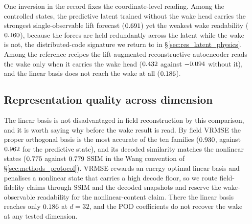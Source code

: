 One inversion in the record fixes the coordinate-level reading. Among the controlled states, the predictive latent trained without the wake head carries the strongest single-observable lift forecast ($0.691$) yet the weakest wake readability ($0.160$), because the forces are held redundantly across the latent while the wake is not, the distributed-code signature we return to in \S\ref{sec:res_latent_physics}. Among the reference recipes the lift-augmented reconstructive autoencoder reads the wake only when it carries the wake head ($0.432$ against $-0.094$ without it), and the linear basis does not reach the wake at all ($0.186$).\re




\subsection{Representation quality across dimension}
\label{sec:res_compress}





The linear basis is not disadvantaged in field reconstruction by this comparison, and it is worth saying why before the wake result is read. By field VRMSE the proper orthogonal basis is the most accurate of the ten families ($0.930$, against $0.962$ for the predictive state), and its decoded similarity matches the nonlinear states ($0.775$ against $0.779$ SSIM in the Wang convention of \S\ref{sec:methods_protocol}). VRMSE rewards an energy-optimal linear basis and penalises a nonlinear state that carries a high decode floor, so we route field-fidelity claims through SSIM and the decoded snapshots and reserve the wake-observable readability for the nonlinear-content claim. There the linear basis reaches only $0.186$ at $d = 32$, and the POD coefficients do not recover the wake at any tested dimension.\re

